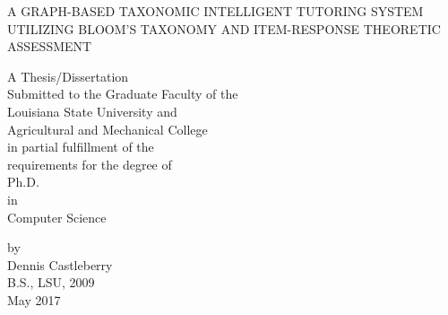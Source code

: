 \documentclass[12pt,letterpaper]{lsuetd}
\begin{document}
\renewcommand\@pnumwidth{1.55em}
\renewcommand\@tocrmarg{9.55em}
\renewcommand*\l@chapter{\@dottedtocline{0}{1.5em}{2.3em}}
\renewcommand*\l@figure{\@dottedtocline{1}{0em}{3.1em}}
\let\l@table\l@figure

\thispagestyle{empty}
\begin{center}
A GRAPH-BASED TAXONOMIC INTELLIGENT TUTORING SYSTEM UTILIZING 
BLOOM'S TAXONOMY AND ITEM-RESPONSE THEORETIC ASSESSMENT

\vfill
\doublespacing
A Thesis/Dissertation \\
\singlespacing
Submitted to the Graduate Faculty of the \\
Louisiana State University and \\
Agricultural and Mechanical College \\
in partial fulfillment of the \\
requirements for the degree of \\
Ph.D. \\
\doublespacing
in \\
                                       
Computer Science \\
\singlespacing
\vfill

by \\
Dennis Castleberry \\
B.S., LSU, 2009 \\
May 2017
\end{center}
\pagebreak


\end{document}
